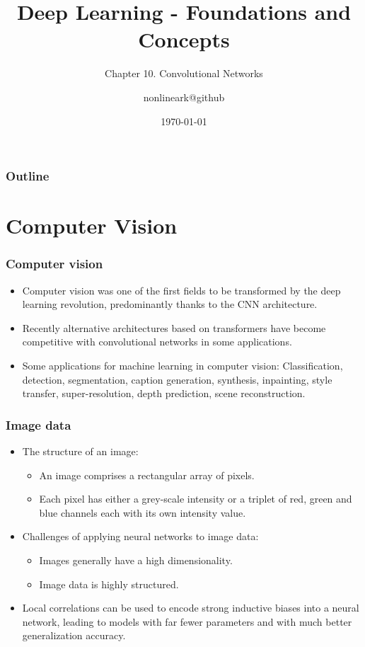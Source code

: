 \documentclass{beamer}
\title{Deep Learning - Foundations and Concepts}
\subtitle{Chapter 10. Convolutional Networks}
\author{nonlineark@github}
\date{\today}
\begin{document}
\begin{frame}
    \titlepage
\end{frame}

\begin{frame}
    \frametitle{Outline}
    \tableofcontents
\end{frame}

\section{Computer Vision}

\begin{frame}
    \frametitle{Computer vision}
    \begin{itemize}
        \item Computer vision was one of the first fields to be transformed by the deep learning revolution, predominantly thanks to the CNN architecture.
        \item Recently alternative architectures based on transformers have become competitive with convolutional networks in some applications.
        \item Some applications for machine learning in computer vision: Classification, detection, segmentation, caption generation, synthesis, inpainting, style transfer, super-resolution, depth prediction, scene reconstruction.
    \end{itemize}
\end{frame}

\begin{frame}
    \frametitle{Image data}
    \begin{itemize}
        \item The structure of an image:
        \begin{itemize}
            \item An image comprises a rectangular array of pixels.
            \item Each pixel has either a grey-scale intensity or a triplet of red, green and blue channels each with its own intensity value.
        \end{itemize}
        \item Challenges of applying neural networks to image data:
        \begin{itemize}
            \item Images generally have a high dimensionality.
            \item Image data is highly structured.
        \end{itemize}
        \item Local correlations can be used to encode strong inductive biases into a neural network, leading to models with far fewer parameters and with much better generalization accuracy.
    \end{itemize}
\end{frame}
\end{document}
